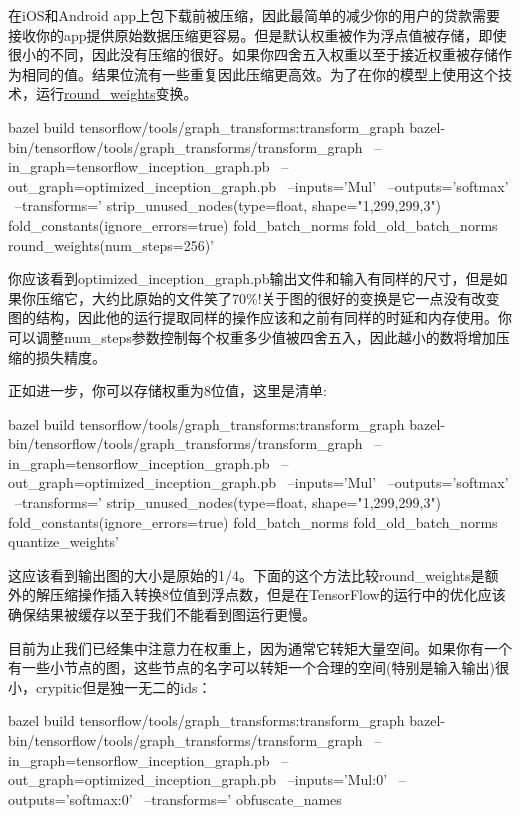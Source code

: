 在iOS和Android app上包下载前被压缩，因此最简单的减少你的用户的贷款需要接收你的app提供原始数据压缩更容易。但是默认权重被作为浮点值被存储，即使很小的不同，因此没有压缩的很好。如果你四舍五入权重以至于接近权重被存储作为相同的值。结果位流有一些重复因此压缩更高效。为了在你的模型上使用这个技术，运行\href{https://github.com/tensorflow/tensorflow/blob/r1.4/tensorflow/tools/graph_transforms/README.md#round_weights}{round_weights}变换。
\begin{bashcode}
bazel build tensorflow/tools/graph_transforms:transform_graph
bazel-bin/tensorflow/tools/graph_transforms/transform_graph \
--in_graph=tensorflow_inception_graph.pb \
--out_graph=optimized_inception_graph.pb \
--inputs='Mul' \
--outputs='softmax' \
--transforms='
  strip_unused_nodes(type=float, shape="1,299,299,3")
  fold_constants(ignore_errors=true)
  fold_batch_norms
  fold_old_batch_norms
  round_weights(num_steps=256)'
\end{bashcode}
你应该看到optimized_inception_graph.pb输出文件和输入有同样的尺寸，但是如果你压缩它，大约比原始的文件笑了70\%!关于图的很好的变换是它一点没有改变图的结构，因此他的运行提取同样的操作应该和之前有同样的时延和内存使用。你可以调整num\_steps参数控制每个权重多少值被四舍五入，因此越小的数将增加压缩的损失精度。

正如进一步，你可以存储权重为8位值，这里是清单:
\begin{bashcode}
bazel build tensorflow/tools/graph_transforms:transform_graph
bazel-bin/tensorflow/tools/graph_transforms/transform_graph \
--in_graph=tensorflow_inception_graph.pb \
--out_graph=optimized_inception_graph.pb \
--inputs='Mul' \
--outputs='softmax' \
--transforms='
  strip_unused_nodes(type=float, shape="1,299,299,3")
  fold_constants(ignore_errors=true)
  fold_batch_norms
  fold_old_batch_norms
  quantize_weights'
\end{bashcode}
这应该看到输出图的大小是原始的1/4。下面的这个方法比较round\_weights是额外的解压缩操作插入转换8位值到浮点数，但是在TensorFlow的运行中的优化应该确保结果被缓存以至于我们不能看到图运行更慢。

目前为止我们已经集中注意力在权重上，因为通常它转矩大量空间。如果你有一个有一些小节点的图，这些节点的名字可以转矩一个合理的空间(特别是输入输出)很小，crypitic但是独一无二的ids：
\begin{bashcode}
bazel build tensorflow/tools/graph_transforms:transform_graph
bazel-bin/tensorflow/tools/graph_transforms/transform_graph \
--in_graph=tensorflow_inception_graph.pb \
--out_graph=optimized_inception_graph.pb \
--inputs='Mul:0' \
--outputs='softmax:0' \
--transforms='
  obfuscate_names
\end{bashcode}
